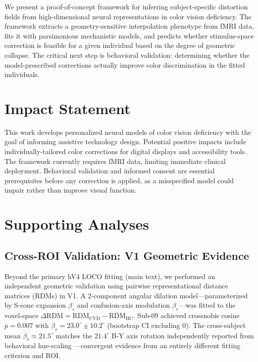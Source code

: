 \documentclass{article}
\begin{document}
We present a proof-of-concept framework for inferring subject-specific distortion fields from high-dimensional neural representations in color vision deficiency.
The framework extracts a geometry-sensitive interpolation phenotype from fMRI data, fits it with parsimonious mechanistic models, and predicts whether stimulus-space correction is feasible for a given individual based on the degree of geometric collapse.
The critical next step is behavioral validation: determining whether the model-prescribed corrections actually improve color discrimination in the fitted individuals.

\section*{Impact Statement}

This work develops personalized neural models of color vision deficiency with the goal of informing assistive technology design.
Potential positive impacts include individually-tailored color corrections for digital displays and accessibility tools.
The framework currently requires fMRI data, limiting immediate clinical deployment.
Behavioral validation and informed consent are essential prerequisites before any correction is applied, as a misspecified model could impair rather than improve visual function.




\newpage
\appendix
\onecolumn

\section{Supporting Analyses}
\label{app:supporting}

\subsection{Cross-ROI Validation: V1 Geometric Evidence}

Beyond the primary hV4 LOCO fitting (main text), we performed an independent geometric validation using pairwise representational distance matrices (RDMs) in V1.
A 2-component angular dilation model---parameterized by S-cone expansion $\beta_s$ and confusion-axis modulation $\beta_c$---was fitted to the voxel-space $\Delta\text{RDM} = \text{RDM}_{\text{CVD}} - \overline{\text{RDM}}_{\text{HC}}$.
Sub-09 achieved crossnobis cosine $p = 0.007$ with $\beta_s = 23.0^\circ \pm 10.2^\circ$ (bootstrap CI excluding 0).
The cross-subject mean $\beta_s \approx 21.5^\circ$ matches the $21.4^\circ$ B-Y axis rotation independently reported from behavioral hue-scaling \cite{placeholder_emery2021}---convergent evidence from an entirely different fitting criterion and ROI.
\end{document}
